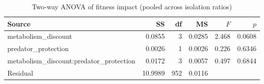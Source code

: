 \begin{table}[htbp]
\centering
\caption{Two-way ANOVA of fitness impact (pooled across isolation ratios)}
\begin{tabular}{lrrrrr}
\toprule
Source & SS & df & MS & $F$ & $p$ \\
\midrule
  metabolism\_discount & 0.0855 & 3 & 0.0285 & 2.468 & 0.0608 \\
  predator\_protection & 0.0026 & 1 & 0.0026 & 0.226 & 0.6346 \\
  metabolism\_discount:predator\_protection & 0.0172 & 3 & 0.0057 & 0.497 & 0.6844 \\
  Residual & 10.9989 & 952 & 0.0116 & & \\
\bottomrule
\end{tabular}
\end{table}
